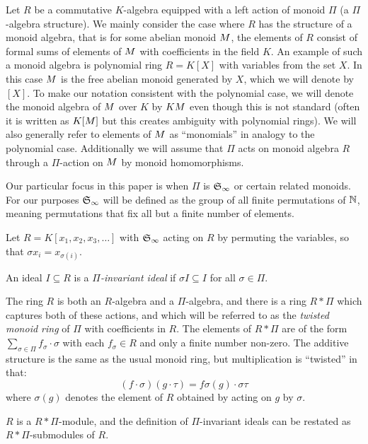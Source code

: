 Let $R$ be a commutative $K$-algebra equipped with a left action of monoid $\Pi$ (a $\Pi$-algebra structure).  We mainly consider the case where $R$ has the structure of a monoid algebra, that is for some abelian monoid $M$, the elements of $R$ consist of formal sums of elements of $M$ with coefficients in the field $K$.  An example of such a monoid algebra is polynomial ring $R = K[X]$ with variables from the set $X$.  In this case $M$ is the free abelian monoid generated by $X$, which we will denote by $[X]$.  To make our notation consistent with the polynomial case, we will denote the monoid algebra of $M$ over $K$ by $KM$ even though this is not standard (often it is written as $K[M]$ but this creates ambiguity with polynomial rings).  We will also generally refer to elements of $M$ as ``monomials'' in analogy to the polynomial case.  Additionally we will assume that $\Pi$ acts on monoid algebra $R$ through a $\Pi$-action on $M$ by monoid homomorphisms.

Our particular focus in this paper is when $\Pi$ is $\mathfrak S_\infty$ or certain related monoids.  For our purposes $\mathfrak S_\infty$ will be defined as the group of all finite permutations of $\mathbb N$, meaning permutations that fix all but a finite number of elements.

\begin{example}
 Let $R = K[x_1,x_2,x_3,\ldots]$ with $\mathfrak S_\infty$ acting on $R$ by permuting the variables, so that $\sigma x_i = x_{\sigma(i)}$.
\end{example}

\begin{definition}
 An ideal $I \subseteq R$ is a {\em $\Pi$-invariant ideal} if $\sigma I \subseteq I$ for all $\sigma \in \Pi$.
\end{definition}

The ring $R$ is both an $R$-algebra and a $\Pi$-algebra, and there is a ring $R*\Pi$ which captures both of these actions, and which will be referred to as the {\em twisted monoid ring} of $\Pi$ with coefficients in $R$.  The elements of $R*\Pi$ are of the form $\sum_{\sigma \in \Pi} f_{\sigma}\cdot \sigma$ with each $f_\sigma \in R$ and only a finite number non-zero.  The additive structure is the same as the usual monoid ring, but multiplication is ``twisted'' in that:
 \[ (f\cdot \sigma)(g \cdot \tau) = f\sigma(g) \cdot \sigma\tau \]
where $\sigma(g)$ denotes the element of $R$ obtained by acting on $g$ by $\sigma$.

$R$ is a $R*\Pi$-module, and the definition of $\Pi$-invariant ideals can be restated as $R*\Pi$-submodules of $R$.

